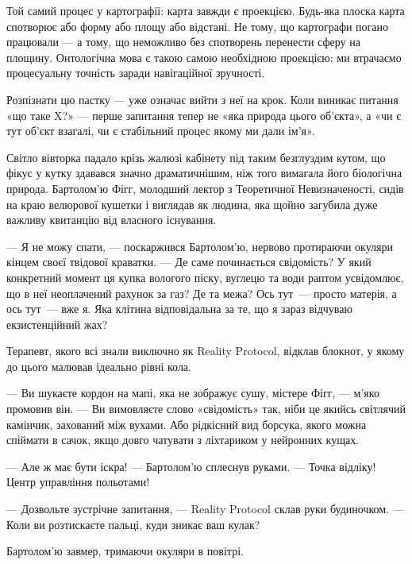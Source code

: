 \documentclass[12pt, a4paper, openany]{book}
\begin{document}
\begin{analogybox}
Той самий процес у картографії: карта завжди є проекцією. Будь-яка плоска карта спотворює або форму або площу або відстані. Не тому, що картографи погано працювали — а тому, що неможливо без спотворень перенести сферу на площину. Онтологічна мова є такою самою необхідною проекцією: ми втрачаємо процесуальну точність заради навігаційної зручності.
\end{analogybox}

Розпізнати цю пастку — уже означає вийти з неї на крок. Коли виникає питання «що таке X?» — перше запитання тепер не «яка природа цього об'єкта», а «чи є тут об'єкт взагалі, чи є стабільний процес якому ми дали ім'я».




\begin{realitybox}
Світло вівторка падало крізь жалюзі кабінету під таким безглуздим кутом, що фікус у кутку здавався значно драматичнішим, ніж того вимагала його біологічна природа. Бартолом'ю Фігг, молодший лектор з Теоретичної Невизначеності, сидів на краю велюрової кушетки і виглядав як людина, яка щойно загубила дуже важливу квитанцію від власного існування.

--- Я не можу спати, --- поскаржився Бартолом'ю, нервово протираючи окуляри кінцем своєї твідової краватки. --- Де саме починається свідомість? У який конкретний момент ця купка вологого піску, вуглецю та води раптом усвідомлює, що в неї неоплачений рахунок за газ? Де та межа? Ось тут~--- просто матерія, а ось тут~--- вже я. Яка клітина відповідальна за те, що я зараз відчуваю екзистенційний жах?

\medskip
Терапевт, якого всі знали виключно як Reality Protocol, відклав блокнот, у якому до цього малював ідеально рівні кола.

--- Ви шукаєте кордон на мапі, яка не зображує сушу, містере Фігг, --- м'яко промовив він. --- Ви вимовляєте слово «свідомість» так, ніби це якийсь світлячий камінчик, захований між вухами. Або рідкісний вид борсука, якого можна спіймати в сачок, якщо довго чатувати з ліхтариком у нейронних кущах.

--- Але ж має бути іскра! --- Бартолом'ю сплеснув руками. --- Точка відліку! Центр управління польотами!

--- Дозвольте зустрічне запитання, --- Reality Protocol склав руки будиночком. --- Коли ви розтискаєте пальці, куди зникає ваш кулак?

Бартолом'ю завмер, тримаючи окуляри в повітрі.


\end{realitybox}
\end{document}
